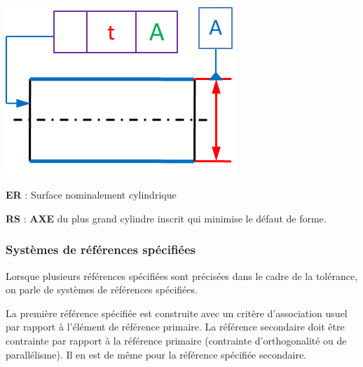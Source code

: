 \documentclass[11pt,oneside]{article}
\begin{document}
\begin{exemple}
\begin{minipage}[t]{.3\linewidth}
\begin{center}
$\;$

\includegraphics[width=.95\textwidth]{png/rs_cyl}
\end{center}
\end{minipage} \hfill
\begin{minipage}[t]{.3\linewidth}
\textbf{ER} : Surface nominalement cylindrique

\textbf{RS} : \textbf{AXE} du plus grand cylindre inscrit qui minimise le défaut de forme.
\end{minipage} \hfill
\begin{minipage}[t]{.3\linewidth}
\begin{center}
\end{center}
\end{minipage} 
\end{exemple}



\subsubsection{Systèmes de références spécifiées}

\begin{defi}
Lorsque plusieurs références spécifiées sont précisées dans le cadre de la tolérance, on parle de systèmes de références spécifiées. 

La première référence spécifiée est construite avec un critère d'association usuel par rapport à l'élément de référence primaire. La référence secondaire doit être contrainte par rapport à la référence primaire (contrainte d'orthogonalité ou de parallélisme). Il en est de même pour la référence spécifiée secondaire. 
\end{defi}
\end{document}
